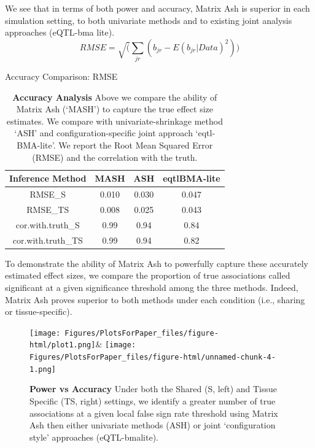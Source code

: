 We see that in terms of both power and accuracy, Matrix Ash is superior in each simulation setting, to both univariate methods and to existing joint analysis approaches (eQTL-bma lite).
\begin{equation}
RMSE = \sqrt(\sum_{jr}(b_{jr}-E(b_{jr}|Data)^2))
\end{equation}
\begin{table}[ht]
\caption{Accuracy Comparison: RMSE}
\centering
\begin{tabular}{c c c c}
\hline\hline
Inference Method & MASH & ASH & eqtlBMA-lite \\ [0.5ex] %
\hline
RMSE_{S}&0.010&0.030&0.047\\
RMSE_{TS}&0.008& 0.025&0.043 \\%
cor.with.truth_{S}&0.99&0.94&0.84\\
cor.with.truth_{TS}&0.99&0.94&0.82\\
\hline
\end{tabular}
\label{table:RMSE}
\caption{\textbf{Accuracy Analysis} Above we compare the ability of Matrix Ash (`MASH') to capture the true effect size estimates. We compare with univariate-shrinkage method `ASH' and configuration-specific joint approach `eqtl-BMA-lite'. We report the Root Mean Squared Error (RMSE) and the correlation with the truth.}
\end{table}

To demonstrate the ability of Matrix Ash to powerfully capture these accurately estimated effect sizes, we compare the proportion of true associations called significant at a given significance threshold among the three methods. Indeed, Matrix Ash proves superior to both methods under each condition (i.e., sharing or tissue-specific). \newline



\begin{figure}[h]
\texttt{[image: Figures/PlotsForPaper\_files/figure-html/plot1.png]}&
\texttt{[image: Figures/PlotsForPaper\_files/figure-html/unnamed-chunk-4-1.png]}
\caption{\textbf{Power vs Accuracy} Under both the Shared (S, left) and Tissue Specific (TS, right) settings, we identify a greater number of true associations at a given local false sign rate threshold using Matrix Ash then either univariate methods (ASH) or joint `configuration style' approaches (eQTL-bmalite).}
\label{fig:powervaccuracy}
\end{figure}\newline

